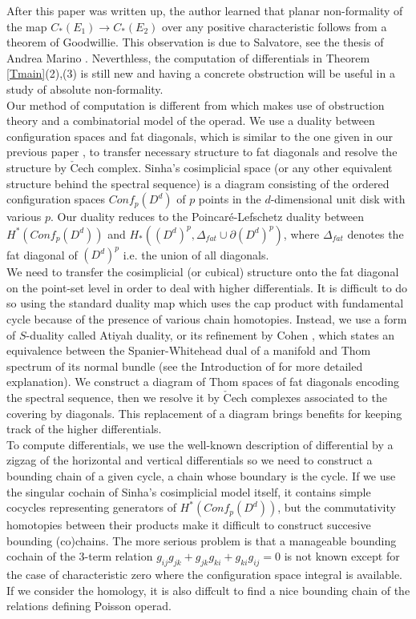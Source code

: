 \documentclass[reqno]{amsart}
\theoremstyle{definition}
\theoremstyle{plain}
\newcommand{\CECHC}{\check{\mathrm{C}}}
\begin{document}
 \indent After this paper was written up, the author learned that  planar non-formality of the map $C_*(E_1)\to C_*(E_2)$ over any positive characteristic follows from a theorem of Goodwillie\cite{goodwillie}. This observation is due to Salvatore, see the thesis of Andrea Marino \cite{marino}. Neverthless, the computation of differentials in Theorem \ref{Tmain}(2),(3) is still new and having a concrete obstruction will be useful in a study of absolute non-formality. \\
\indent Our method of computation is different from \cite{salvatore} which makes use of  obstruction theory and  a combinatorial model of the operad. We use a duality between configuration spaces and fat diagonals, which is similar to the one given in our previous paper \cite{moriya1}, to transfer necessary structure to fat diagonals and resolve the structure by $\check{\text{C}}$ech complex. Sinha's cosimplicial space (or any other equivalent structure behind the spectral sequence) is a diagram consisting  of the ordered configuration spaces $Conf_p(D^d)$ of $p$ points in the $d$-dimensional unit disk with various $p$. Our duality reduces to the Poincar\'e-Lefschetz duality between $H^*(Conf_p(D^d))$ and  $H_*((D^d)^p,\Delta_{fat}\cup \partial (D^d)^p)$, where $\Delta_{fat}$ denotes the fat diagonal of $(D^d)^{p}$ i.e.  the union of all diagonals. \\
\indent We need to transfer the cosimplicial (or cubical) structure onto the fat diagonal on the point-set level in order to deal with higher differentials. It is difficult to do so using the standard  duality map which uses the cap product with fundamental cycle because of the presence of various chain homotopies. Instead, we use a form of $S$-duality called Atiyah duality, or its refinement by Cohen \cite{cohen}, which states an equivalence between the Spanier-Whitehead dual of a manifold and Thom spectrum of its normal bundle (see the Introduction of \cite{moriya1} for more detailed explanation).   We construct a diagram of Thom spaces of fat diagonals encoding the spectral sequence, then we resolve it by $\CECHC$ech complexes associated to the covering by diagonals. This replacement of a diagram brings  benefits for keeping track of the higher differentials. \\
\indent To compute differentials, we use the well-known description of differential by a zigzag of the horizontal and vertical differentials so we need to construct a bounding chain of a given cycle, a chain whose boundary is the cycle.  If we use the singular cochain of Sinha's cosimplicial model itself, it contains simple cocycles representing generators of $H^*(Conf_p(D^d))$, but the commutativity homotopies between their products make it difficult to construct succesive bounding (co)chains. The more serious problem is that a manageable bounding cochain of the 3-term relation $g_{ij}g_{jk}+g_{jk}g_{ki}+g_{ki}g_{ij}=0$ is not known except for the case of characteristic zero where the configuration space integral is available. If we consider the  homology, it is also diffcult to find a nice bounding chain of the relations defining Poisson operad.  
\end{document}
